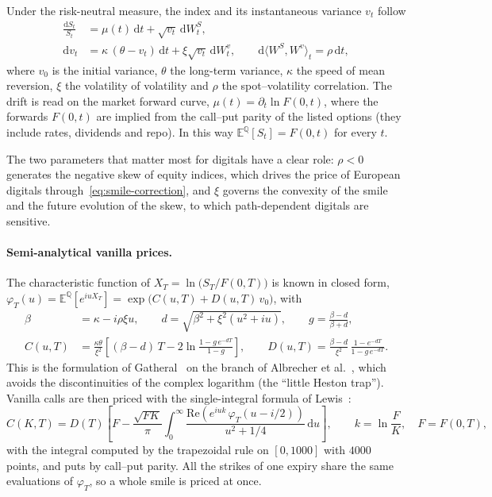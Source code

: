 \documentclass[11pt,a4paper]{article}
\theoremstyle{remark}
\newcommand{\E}{\mathbb{E}}
\newcommand{\Q}{\mathbb{Q}}
\newcommand{\dd}{\mathrm{d}}
\begin{document}
Under the risk-neutral measure, the index and its instantaneous variance $v_t$
follow
\begin{equation}
\begin{aligned}
  \frac{\dd S_t}{S_t} &= \mu(t)\,\dd t + \sqrt{v_t}\,\dd W^S_t, \\
  \dd v_t &= \kappa\,(\theta - v_t)\,\dd t + \xi\sqrt{v_t}\,\dd W^v_t,
  \qquad \dd\langle W^S, W^v\rangle_t = \rho\,\dd t,
\end{aligned}
\label{eq:heston-sde}
\end{equation}
where $v_0$ is the initial variance, $\theta$ the long-term variance, $\kappa$
the speed of mean reversion, $\xi$ the volatility of volatility and $\rho$ the
spot--volatility correlation. The drift is read on the market forward curve,
$\mu(t) = \partial_t \ln F(0,t)$, where the forwards $F(0,t)$ are implied from
the call--put parity of the listed options (they include rates, dividends and
repo). In this way $\E^{\Q}[S_t] = F(0,t)$ for every $t$.

The two parameters that matter most for digitals have a clear role: $\rho < 0$
generates the negative skew of equity indices, which drives the price of
European digitals through~\eqref{eq:smile-correction}, and $\xi$ governs the
convexity of the smile and the future evolution of the skew, to which
path-dependent digitals are sensitive.

\paragraph{Semi-analytical vanilla prices.}
The characteristic function of $X_T = \ln\bigl(S_T/F(0,T)\bigr)$ is known in
closed form, $\varphi_T(u) = \E^{\Q}[e^{iuX_T}] = \exp\bigl(C(u,T) + D(u,T)\,v_0\bigr)$,
with
\begin{equation}
\begin{aligned}
  \beta &= \kappa - i\rho\xi u, \qquad
  d = \sqrt{\beta^2 + \xi^2(u^2 + iu)}, \qquad
  g = \frac{\beta - d}{\beta + d}, \\
  C(u,T) &= \frac{\kappa\theta}{\xi^2}\left[(\beta - d)\,T
            - 2\ln\frac{1 - g\,e^{-dT}}{1 - g}\right], \qquad
  D(u,T) = \frac{\beta - d}{\xi^2}\,\frac{1 - e^{-dT}}{1 - g\,e^{-dT}}.
\end{aligned}
\label{eq:heston-cf}
\end{equation}
This is the formulation of Gatheral~\cite{Gatheral2006} on the branch of
Albrecher et al.~\cite{Albrecher2007}, which avoids the discontinuities of the
complex logarithm (the ``little Heston trap''). Vanilla calls are then priced
with the single-integral formula of Lewis~\cite{Lewis2001}:
\begin{equation}
  C(K,T) = D(T)\left[F - \frac{\sqrt{FK}}{\pi}\int_0^{\infty}
           \frac{\mathrm{Re}\!\left(e^{iuk}\,\varphi_T(u - i/2)\right)}{u^2 + 1/4}\,\dd u\right],
  \qquad k = \ln\frac{F}{K},\quad F = F(0,T),
  \label{eq:lewis}
\end{equation}
with the integral computed by the trapezoidal rule on $[0, 1000]$ with $4000$
points, and puts by call--put parity. All the strikes of one expiry share the
same evaluations of $\varphi_T$, so a whole smile is priced at once.
\end{document}
